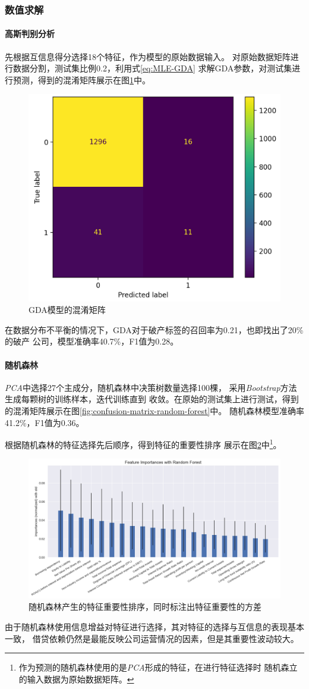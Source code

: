 \subsubsection{数值求解}
\paragraph{高斯判别分析}
先根据互信息得分选择18个特征，作为模型的原始数据输入。
对原始数据矩阵进行数据分割，测试集比例0.2，利用式\ref{eq:MLE-GDA}
求解GDA参数，对测试集进行预测，得到的混淆矩阵展示在图\ref{fig:confusion-matrix-GDA}中。
\begin{figure}[ht]
    \centering
    \includegraphics[width=.5\textwidth]{images/confusion_matrix_GDA.png}
    \caption{GDA模型的混淆矩阵}
    \label{fig:confusion-matrix-GDA}
\end{figure}
在数据分布不平衡的情况下，GDA对于破产标签的召回率为0.21，也即找出了20\%的破产
公司，模型准确率40.7\%，F1值为0.28。

\paragraph{随机森林}
\textit{PCA}中选择27个主成分，随机森林中决策树数量选择100棵，
采用\textit{Bootstrap}方法生成每颗树的训练样本，迭代训练直到
收敛。在原始的测试集上进行测试，得到的混淆矩阵展示在图\ref{fig:confusion-matrix-random-forest}中。
随机森林模型准确率41.2\%，F1值为0.36。
\par 根据随机森林的特征选择先后顺序，得到特征的重要性排序
展示在图\ref{fig:feature-importance-random-forest}中\footnote{
    作为预测的随机森林使用的是\textit{PCA}形成的特征，在进行特征选择时
    随机森立的输入数据为原始数据矩阵。
}。
\begin{figure}[ht]
    \centering
    \includegraphics[width=.8\textwidth]{images/feature_importances_random_forest.png}
    \caption{随机森林产生的特征重要性排序，同时标注出特征重要性的方差}
    \label{fig:feature-importance-random-forest}
\end{figure}
由于随机森林使用信息增益对特征进行选择，其对特征的选择与互信息的表现基本一致，
借贷依赖仍然是最能反映公司运营情况的因素，但是其重要性波动较大。


